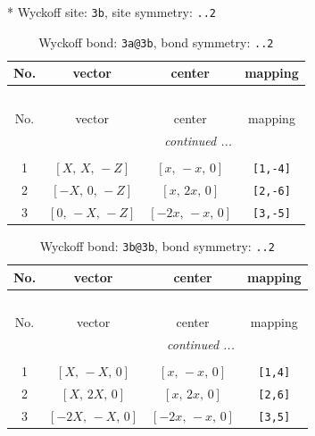 \documentclass[fleqn,8pt]{jsarticle}
\begin{document}
* Wyckoff site: {\tt 3b}, site symmetry: {\tt ..2}
\renewcommand{\arraystretch}{1.2}
\begin{longtable}{cccc}
\caption{Wyckoff bond: {\tt 3a@3b}, bond symmetry: {\tt ..2}}
 \\
 \hline \hline
No. & vector & center & mapping \\ \hline \endfirsthead

\multicolumn{3}{l}{\tablename\ \thetable{}} \\
 \hline \hline
No. & vector & center & mapping \\ \hline \endhead

 \hline \hline
\multicolumn{3}{r}{\footnotesize\it continued ...} \\ \endfoot

 \hline \hline
\multicolumn{3}{r}{} \\ \endlastfoot

1 & $\left[ X,\, X,\, - Z \right]$ & $\left[ x,\, - x,\, 0 \right]$ & {\tt [1,-4]} \\ \hline
2 & $\left[ - X,\, 0,\, - Z \right]$ & $\left[ x,\, 2 x,\, 0 \right]$ & {\tt [2,-6]} \\ \hline
3 & $\left[ 0,\, - X,\, - Z \right]$ & $\left[ - 2 x,\, - x,\, 0 \right]$ & {\tt [3,-5]} \\
\end{longtable}
\renewcommand{\arraystretch}{1.2}
\begin{longtable}{cccc}
\caption{Wyckoff bond: {\tt 3b@3b}, bond symmetry: {\tt ..2}}
 \\
 \hline \hline
No. & vector & center & mapping \\ \hline \endfirsthead

\multicolumn{3}{l}{\tablename\ \thetable{}} \\
 \hline \hline
No. & vector & center & mapping \\ \hline \endhead

 \hline \hline
\multicolumn{3}{r}{\footnotesize\it continued ...} \\ \endfoot

 \hline \hline
\multicolumn{3}{r}{} \\ \endlastfoot

1 & $\left[ X,\, - X,\, 0 \right]$ & $\left[ x,\, - x,\, 0 \right]$ & {\tt [1,4]} \\ \hline
2 & $\left[ X,\, 2 X,\, 0 \right]$ & $\left[ x,\, 2 x,\, 0 \right]$ & {\tt [2,6]} \\ \hline
3 & $\left[ - 2 X,\, - X,\, 0 \right]$ & $\left[ - 2 x,\, - x,\, 0 \right]$ & {\tt [3,5]} \\
\end{longtable}
\end{document}
